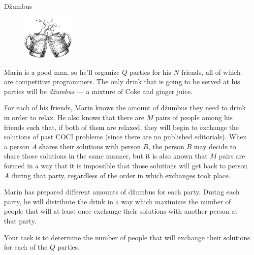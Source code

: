 \begin{statement}[
  problempoints=110,
  timelimit=1 sekunda,
  memorylimit=512 MiB,
]{Džumbus}

\setlength\intextsep{-0.1cm}
\begin{figure}
\centering
\includegraphics[width=0.23\textwidth]{img/dzumbus.png}
\end{figure}


Marin is a good man, so he'll organize $Q$ parties for his $N$ friends, all of
which are competitive programmers. The only drink that is going to be served at
his parties will be \textit{džumbus} --- a mixture of Coke and ginger juice.

For each of his friends, Marin knows the amount of džumbus they need to
drink in order to relax. He also knows that there are $M$ pairs of people among
his friends such that, if both of them are relaxed, they will begin to
exchange the solutions of past COCI problems (since there are no
published editorials). When a person $A$ shares their solutions with person $B$,
the person $B$ may decide to share those solutions in the same manner, but it is
also known that $M$ pairs are formed in a way that it is impossible that those
solutions will get back to person $A$ during that party, regardless of the order in
which exchanges took place.

Marin has prepared different amounts of džumbus for each party. During each
party, he will distribute the drink in a way which maximizes the number of
people that will at least once exchange their solutions with another person
at that party.

Your task is to determine the number of people that will exchange their
solutions for each of the $Q$ parties.

\end{statement}
